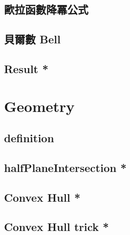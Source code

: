 \documentclass[a4paper,10pt,twocolumn,oneside]{article}
\begin{document}
\subsection{歐拉函數降冪公式}


\subsection{貝爾數 Bell}


\subsection{Result *}


\section{Geometry}

% 

\subsection{definition}


% 

\subsection{halfPlaneIntersection *}

% 

\subsection{Convex Hull *}


\subsection{Convex Hull trick *}

\end{document}
